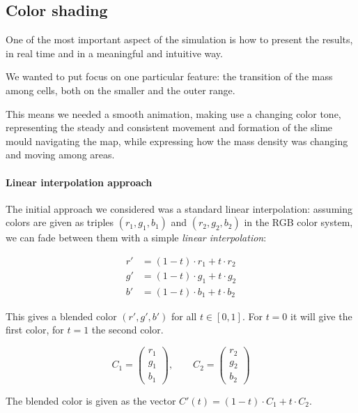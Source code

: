 \subsection{Color shading}

One of the most important aspect of the simulation is how to present the results, in real time and in a meaningful and intuitive way. 

We wanted to put focus on one particular feature: the transition of the mass among cells, both on the smaller and the outer range.

This means we needed a smooth animation, making use a changing color tone, representing the steady and consistent movement and formation of the slime mould navigating the map, while expressing how the mass density was changing and moving among areas.

\paragraph{Linear interpolation approach}

The initial approach we considered was a standard linear interpolation: assuming colors are given as triples $(r_1,g_1,b_1)$ and $(r_2,g_2,b_2)$ in the RGB color system, we can fade between them with a simple \textit{linear interpolation}:

\begin{align}
r' &= (1-t)\cdot r_1+t\cdot r_2\\
g' &= (1-t)\cdot g_1+t\cdot g_2\\
b' &= (1-t)\cdot b_1+t\cdot b_2
\end{align}

This gives a blended color $(r',g',b')$ for all $t\in[0,1]$. For $t=0$ it will give the first color, for $t=1$ the second color.


$$ C_1=\begin{pmatrix}r_1\\g_1\\b_1\end{pmatrix}, \qquad C_2=\begin{pmatrix}r_2\\g_2\\b_2\end{pmatrix}$$

The blended color is given as the vector $C'(t)=(1-t)\cdot C_1+t\cdot C_2$.


